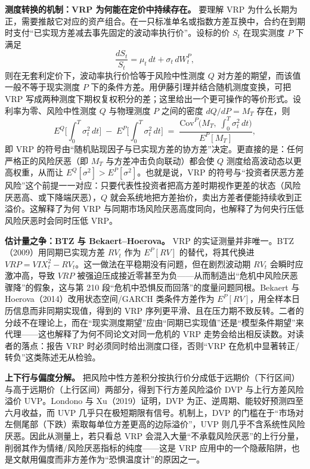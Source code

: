 \documentclass[11pt,a4paper]{ctexart}
\begin{document}
\textbf{测度转换的机制：VRP 为何能在定价中持续存在。} 要理解 VRP 为什么长期为正，需要推敲它对应的资产组合。在一只标准单名或指数方差互换中，合约在到期时支付“已实现方差减去事先固定的波动率执行价”。设标的价 $S_t$ 在现实测度 $P$ 下满足
\[
\frac{dS_t}{S_t}=\mu_t\,dt+\sigma_t\,dW^P_t ,
\]
则在无套利定价下，波动率执行价恰等于风险中性测度 $Q$ 对方差的期望，而该值一般不等于现实测度 $P$ 下的条件方差。用伊藤引理并结合随机测度变换，可把 VRP 写成两种测度下期权复权积分的差；这里给出一个更可操作的等价形式。设利率为零、风险中性测度 $Q$ 与物理测度 $P$ 之间的密度 $dQ/dP=M_T$ 存在，则
\[
E^Q\!\Big[\int_0^T\sigma_t^2\,dt\Big]\;-\;E^P\!\Big[\int_0^T\sigma_t^2\,dt\Big]
\;=\;
\frac{\mathrm{Cov}^P\!\Big(M_T,\;\int_0^T\sigma_t^2\,dt\Big)}{E^P[M_T]},
\]
即 VRP 的符号由“随机贴现因子与已实现方差的协方差”决定。更直接的是：任何严格正的风险厌恶（即 $M_T$ 与方差冲击负向联动）都会使 $Q$ 测度给高波动态以更高权重，从而让 $E^Q[\sigma^2]>E^P[\sigma^2]$。也就是说，VRP 的符号与“投资者厌恶方差风险”这个前提一一对应：只要代表性投资者把高方差时期视作更差的状态（风险厌恶高、或下降端厌恶），$Q$ 就会系统地把方差抬价，卖出方差者便能持续收到正溢价。这解释了为何 VRP 与同期市场风险厌恶高度同向，也解释了为何央行压低风险厌恶时会同时压低 VRP。

\textbf{估计量之争：BTZ 与 Bekaert–Hoerova。} VRP 的实证测量并非唯一。BTZ（2009）用同期已实现方差 $RV_t$ 作为 $E^P[RV]$ 的替代，将其代换进 $VRP=VIX_t^2-RV_t$。这一做法在平稳期没有问题，但在剧烈波动期 $RV_t$ 会瞬时应激冲高，导致 $VRP$ 被强迫压成接近零甚至为负——从而制造出“危机中风险厌恶骤降”的假象，这与第 210 段“危机中恐惧反而回落”的度量问题同根。Bekaert 与 Hoerova（2014）改用状态空间/GARCH 类条件方差作为 $E^P[RV]$，用全样本日历信息而非同期实现值，得到的 VRP 序列更平滑、且在压力期不致反转。二者的分歧不在理论上，而在“现实测度期望”应由“同期已实现值”还是“模型条件期望”来代理——这也解释了为何不同论文对同一危机的 VRP 走势会给出相反读数。对读者的落点：报告 VRP 时必须同时给出测度口径，否则“VRP 在危机中显著转正/转负”这类陈述无从检验。

\textbf{上下行与偏度分解。} 把风险中性方差积分按执行价分成低于远期价（下行区间）与高于远期价（上行区间）两部分，得到下行方差风险溢价 DVP 与上行方差风险溢价 UVP。Londono 与 Xu（2019）证明，DVP 为正、逆周期、能较好预测四至六月收益，而 UVP 几乎只在极短期限有信号。机制上，DVP 的门槛在于“市场对左侧尾部（下跌）索取每单位方差更高的边际溢价”，UVP 则几乎不含系统性风险厌恶。因此从测量上，若只看总 VRP 会混入大量“不承载风险厌恶”的上行分量，削弱其作为情绪/风险厌恶指标的纯度——这是 VRP 应用中的一个隐蔽陷阱，也是文献用偏度而非方差作为“恐惧温度计”的原因之一。
\end{document}
